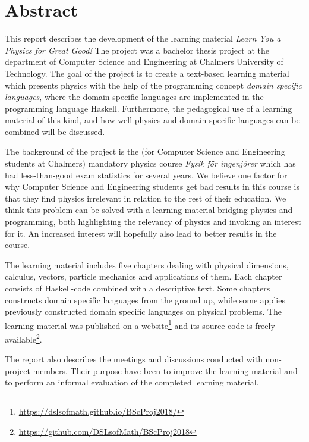 \setlength{\parskip}{0.5cm}

\thispagestyle{plain}			%
\section*{Abstract}

This report describes the development of the learning material \textit{Learn You
a Physics for Great Good!} The project was a bachelor thesis project at the
department of Computer Science and Engineering at Chalmers University of
Technology. The goal of the project is to create a text-based learning material
which presents physics with the help of the programming concept \textit{domain
specific languages}, where the domain specific languages are implemented in the
programming language Haskell. Furthermore, the pedagogical use of a learning
material of this kind, and how well physics and domain specific languages can be
combined will be discussed.

The background of the project is the (for Computer Science and Engineering
students at Chalmers) mandatory physics course \textit{Fysik för ingenjörer}
which has had less-than-good exam statistics for several years. We believe one
factor for why Computer Science and Engineering students get bad results in this
course is that they find physics irrelevant in relation to the rest of their
education. We think this problem can be solved with a learning material bridging
physics and programming, both highlighting the relevancy of physics and invoking
an interest for it. An increased interest will hopefully also lead to better
results in the course.

The learning material includes five chapters dealing with physical dimensions,
calculus, vectors, particle mechanics and applications of them. Each chapter
consists of Haskell-code combined with a descriptive text. Some chapters
constructs domain specific languages from the ground up, while some applies
previously constructed domain specific languages on physical problems. The
learning material was published on a
website\footnote{\url{https://dslsofmath.github.io/BScProj2018/}} and its source
code is freely
available\footnote{\url{https://github.com/DSLsofMath/BScProj2018}}.

The report also describes the meetings and discussions conducted with
non-project members. Their purpose have been to improve the learning material
and to perform an informal evaluation of the completed learning material.


